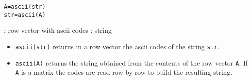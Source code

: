 
\begin{mandesc}
\end{mandesc}

\begin{calling_sequence}
\begin{verbatim}
A=ascii(str)  
str=ascii(A)  
\end{verbatim}
\end{calling_sequence}

\begin{parameters}
  \begin{varlist}
    : row vector with ascii codes
    : string
  \end{varlist}
\end{parameters}
\begin{mandescription}
\begin{itemize}
  \item \verb+ascii(str)+ returns in a row vector the ascii codes 
    of the string \verb+str+. 
  \item \verb+ascii(A)+ returns the string obtained from the contents 
    of the row vector \verb+A+. If \verb+A+ is a matrix the codes are read
    row by row to build the resulting string.
\end{itemize}


\end{mandescription}
